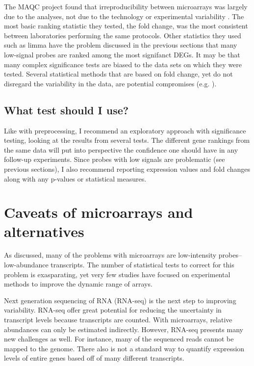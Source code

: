 The MAQC project found that irreproducibility between
microarrays was largely due to the analyses, not due to the technology
or experimental variability \cite{Shi:2006dl}.
The most basic ranking statistic they tested, the fold change, 
was the most consistent between laboratories performing the same protocols.
Other statistics they used such as limma have the problem discussed in the previous
sections that many low-signal probes are ranked among the most signifanct DEGs.
It may be that many complex significance tests are biased to
the data sets on which they were tested. Several statistical
methods that are based on fold change, yet do not disregard
the variability in the data, are potential 
compromises (e.g. \cite{Dembele:2014cn,Yanofsky:2010by,Farztdinov:2012to,
Theilhaber:2001uc,McCarthy:2009dn,Stevens:2010jk,Deng:2009vh,Hein:2006jo}).


\subsection{What test should I use?}

Like with preprocessing, I recommend an exploratory approach
with significance testing, looking at the results from several tests. 
The different gene rankings from the same data
will put into perspective the confidence one should have
in any follow-up experiments. Since probes with low signals
are problematic (see previous sections), I also recommend reporting
expression values and fold changes along with any p-values
or statistical measures.


\section{Caveats of microarrays and alternatives}

As discussed, many of the problems with microarrays are low-intensity probes--
low-abundance transcripts. The number of statistical tests to correct
for this problem is exasparating, yet very few studies have
focused on experimental methods to improve the dynamic range
of arrays. 

Next generation sequencing of RNA (RNA-seq) is the
next step to improving variability. RNA-seq offer great
potential for reducing the uncertainty in transcript levels because
transcripts are counted. With microarrays, relative abundances
can only be estimated indirectly. However, RNA-seq presents
many new challenges as well. For instance, many of the sequenced
reads cannot be mapped to the genome. There also is not
a standard way to quantify expression
levels of entire genes based off of many different transcripts.


